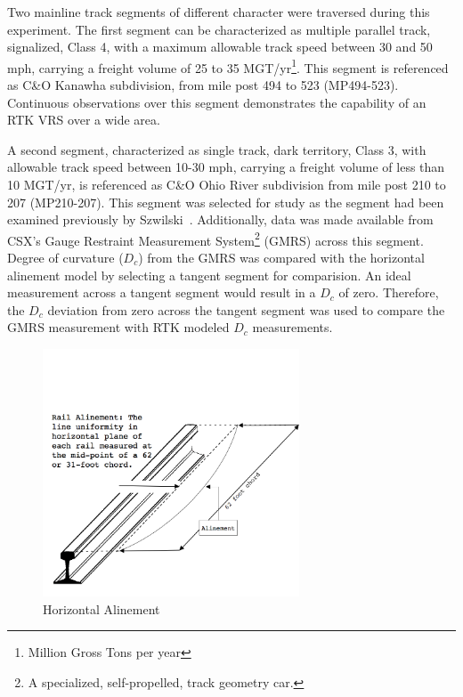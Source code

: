 Two mainline track segments of different character were traversed during this experiment. The first segment can be characterized as multiple parallel track, signalized, Class 4, with a maximum allowable track speed between 30 and 50 mph, carrying a freight volume of 25 to 35 MGT/yr\footnote{Million Gross Tons per year}. This segment is referenced as C\&O Kanawha subdivision, from mile post 494 to 523 (MP494-523). Continuous observations over this segment demonstrates the capability of an RTK VRS over a wide area.

A second segment, characterized as single track, dark territory, Class 3, with allowable track speed between 10-30 mph, carrying a freight volume of less than 10 MGT/yr, is referenced as C\&O Ohio River subdivision from mile post 210 to 207 (MP210-207). This segment was selected for study as the segment had been examined previously by Szwilski~\citep{Szwilski03}. Additionally, data was made available from CSX's Gauge Restraint Measurement System\footnote{A specialized, self-propelled, track geometry car.} (GMRS) across this segment. Degree of curvature (${D_c}$) from the GMRS was compared with the horizontal alinement model by selecting a tangent segment for comparision. An ideal measurement across a tangent segment would result in a ${D_c}$ of zero. Therefore, the ${D_c}$ deviation from zero across the tangent segment was used to compare the GMRS measurement with RTK modeled ${D_c}$ measurements.

\begin{figure}[!htp]
	\vspace{-20pt}
		\begin{center}
			\includegraphics[width=3in]{graphics/HorzAlignment.png}
			\caption{Horizontal Alinement}\label{fig:Alinement}
		\end{center}
\end{figure}

